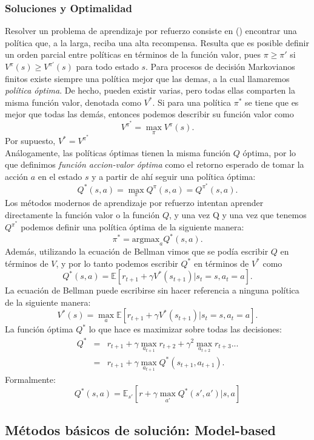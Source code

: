\documentclass[11pt]{article}
\theoremstyle{plain}
\begin{document}
\subsubsection{Soluciones y Optimalidad}
Resolver un problema de aprendizaje por refuerzo consiste en (\cite{sutton1988learning}) encontrar una política que, a la larga, reciba una alta recompensa. Resulta que es posible definir un orden parcial entre políticas en términos de la función valor, pues $\pi \geq \pi'$ si $V^{\pi}(s) \geq V^{\pi'}(s)$ para todo estado $s$. Para procesos de decisión Markovianos finitos existe siempre una política mejor que las demas, a la cual llamaremos \textit{política óptima}. De hecho, pueden existir varias, pero todas ellas comparten la misma función valor, denotada como $V^\ast$. Si para una política $\pi^\ast$ se tiene que es mejor que todas las demás, entonces podemos describir su función valor como
\[  V^{\pi^\ast} = \max_{\pi} V^{\pi}(s).\]
Por supuesto, $V^\ast = V^{\pi^\ast}$
\\
Análogamente, las políticas óptimas tienen la misma función $Q$ óptima, por lo que definimos \textit{función accion-valor óptima} como el retorno esperado de tomar la acción $a$ en el estado $s$ y a partir de ahí seguir una política óptima:
\[ Q^\ast (s,a) = \max_\pi Q^{\pi}(s,a) = Q^{\pi^\ast}(s,a). \]
Los métodos modernos de aprendizaje por refuerzo intentan aprender directamente la función valor o la función $Q$, y una vez Q y una vez que tenemos $Q^{\pi^\ast}$ podemos definir una política óptima de la siguiente manera:
\[ \pi^\ast = \text{argmax}_a Q^\ast (s,a). \]
Además, utilizando la ecuación de Bellman vimos que se podía escribir $Q$ en términos de $V$, y por lo tanto podemos escribir $Q^\ast$ en términos de $V^\ast$ como
\[ Q^\ast (s,a) = \mathbb{E}[r_{t+1} + \gamma V^\ast (s_{t+1}) | s_t = s, a_t = a]. \]
La ecuación de Bellman puede escribirse sin hacer referencia a ninguna política de la siguiente manera:
\[ V^\ast (s) = \max_a \mathbb{E}[r_{t+1} + \gamma V^\ast (s_{t+1}) | s_t = s, a_t = a]. \]
La función óptima $ Q^\ast$ lo que hace es maximizar sobre todas las decisiones:
\begin{eqnarray*}
Q^\ast &=& r_{t+1} + \gamma \max_{a_{t+1}} r_{t+2} + \gamma^2 \max_{a_{t+2}} r_{t+3}...\\
&=& r_{t+1} + \gamma \max_{a_{t+1}} Q^{\ast} (s_{t+1},a_{t+1}).
\end{eqnarray*}
Formalmente:
\[ Q^\ast(s,a)=\mathbb{E}_{s'} [r + \gamma \max_{a'} Q^\ast(s',a')|s,a] \]
\subsection{Métodos básicos de solución: Model-based}
\end{document}
